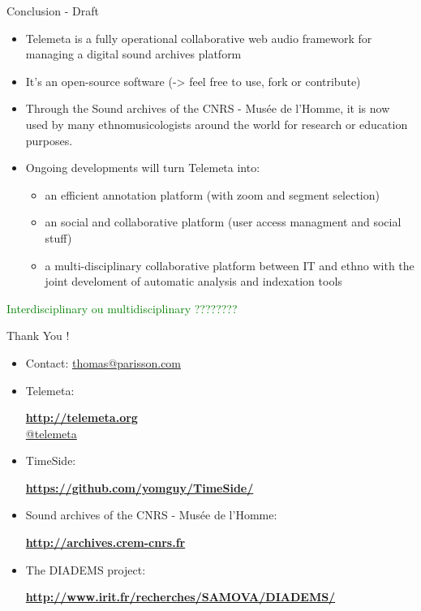 \documentclass[final, hyperref, table]{beamer}
\begin{document}
\begin{frame}{Conclusion - Draft}
  \begin{itemize}[<+->]
  \item Telemeta is a \alert{fully operational} collaborative web audio framework for managing a digital sound archives platform
  \item It's an \alert{open-source} software (-> feel free to use, fork or contribute)
  \item Through the Sound archives of the CNRS - Musée de
l’Homme, it is now used by many ethnomusicologists around the world for research or education purposes.
  \item Ongoing developments will turn Telemeta into:
    \begin{itemize}\scriptsize
    \item an efficient annotation platform (with zoom and segment selection)
    \item an social and collaborative platform (user access managment and social stuff)
    \item a multi-disciplinary collaborative platform between IT and ethno with the joint develoment of automatic analysis and indexation tools
    \end{itemize}
  \end{itemize}
\textcolor{green}{Interdisciplinary ou multidisciplinary ????????}
\end{frame}
\begin{frame}
  Thank You !\\
  \begin{itemize}
  \item Contact: \url{thomas@parisson.com}
  \item Telemeta:
    \begin{center}
      \colorbox{yellow!40}{\textbf{\url{http://telemeta.org}}}\\
      \colorbox{yellow!40}{\href{https://twitter.com/telemeta/}{@telemeta}}
    \end{center}

  \item TimeSide:
    \begin{center}
      \colorbox{yellow!40}{\bf
        \url{https://github.com/yomguy/TimeSide/}}
    \end{center}

  \item Sound archives of the CNRS - Musée de l’Homme:
    \begin{center}
      \colorbox{yellow!40}{\bf\url{http://archives.crem-cnrs.fr}}
    \end{center}

  \item The DIADEMS project:
    \begin{center}
      \colorbox{yellow!40}{\bf
        \url{http://www.irit.fr/recherches/SAMOVA/DIADEMS/}}
    \end{center}

  \end{itemize}

\end{frame}
\end{document}

